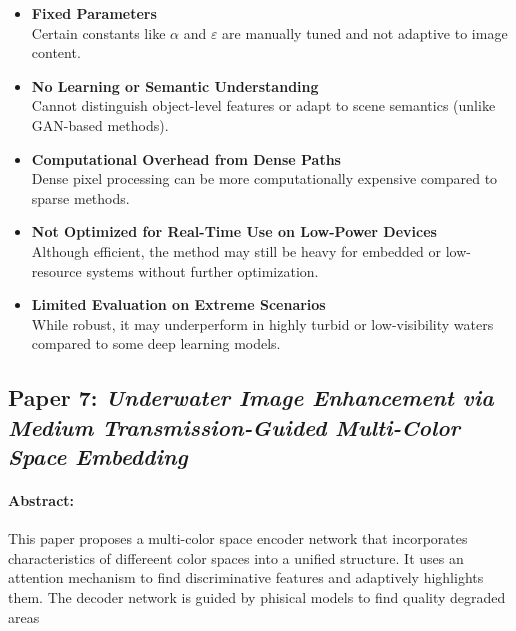 \documentclass{article}
\begin{document}
\begin{itemize}
    \item \textbf{Fixed Parameters} \\
          Certain constants like $\alpha$ and $\varepsilon$ are manually tuned and not adaptive to image content.

    \item \textbf{No Learning or Semantic Understanding} \\
          Cannot distinguish object-level features or adapt to scene semantics (unlike GAN-based methods).

    \item \textbf{Computational Overhead from Dense Paths} \\
          Dense pixel processing can be more computationally expensive compared to sparse methods.

    \item \textbf{Not Optimized for Real-Time Use on Low-Power Devices} \\
          Although efficient, the method may still be heavy for embedded or low-resource systems without further optimization.

    \item \textbf{Limited Evaluation on Extreme Scenarios} \\
          While robust, it may underperform in highly turbid or low-visibility waters compared to some deep learning models.
\end{itemize}

\subsection{Paper 7: \textit{Underwater Image Enhancement via Medium
        Transmission-Guided Multi-Color Space Embedding\cite{Li_2021}}}

\paragraph{Abstract:}
This paper proposes a multi-color space encoder network that incorporates characteristics of differeent color spaces into a unified structure. It uses an attention mechanism to find discriminative features and adaptively highlights them. The decoder network is guided by phisical models to find quality degraded areas
\end{document}
